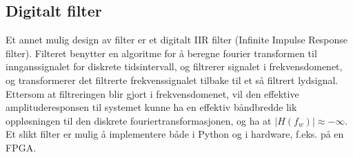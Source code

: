 \subsection{Digitalt filter}
Et annet mulig design av filter er et digitalt IIR filter (Infinite Impulse Response filter).
Filteret benytter en algoritme for å beregne fourier transformen til innganssignalet for diskrete tidsintervall, og filtrerer signalet i
frekvensdomenet, og transformerer det filtrerte frekvenssignalet tilbake til et så filtrert lydsignal. Ettersom at filtreringen blir gjort 
i frekvensdomenet, vil den effektive amplituderesponsen til systemet kunne ha en effektiv båndbredde lik oppløsningen til den diskrete fouriertransformasjonen,
og ha at $|H(f_w)| \approx -\infty$. Et slikt filter er mulig å implementere både i Python og i hardware, f.eks. på en FPGA.
